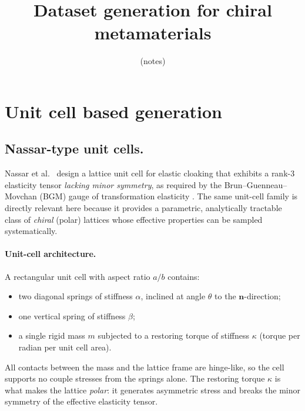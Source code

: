 \documentclass{article}
\title{Dataset generation for chiral metamaterials\vspace{-1em}}
\author{(notes)}
\date{}
\begin{document}
\maketitle
\tableofcontents

\section{Unit cell based generation}


\subsection{Nassar-type unit cells.}

Nassar et al.\ \cite{nassar2018} design a lattice unit cell for elastic
cloaking that exhibits a rank-3 elasticity tensor \emph{lacking minor
symmetry}, as required by the Brun--Guenneau--Movchan (BGM) gauge of
transformation elasticity \cite{brun2009}.  The same unit-cell family is
directly relevant here because it provides a parametric, analytically
tractable class of \emph{chiral} (polar) lattices whose effective properties
can be sampled systematically.

\paragraph{Unit-cell architecture.}
A rectangular unit cell with aspect ratio $a/b$ contains:
\begin{itemize}
    \item two diagonal springs of stiffness $\alpha$, inclined at angle
          $\theta$ to the $\mathbf{n}$-direction;
    \item one vertical spring of stiffness $\beta$;
    \item a single rigid mass $m$ subjected to a restoring torque of
          stiffness $\kappa$ (torque per radian per unit cell area).
\end{itemize}
All contacts between the mass and the lattice frame are hinge-like, so the
cell supports no couple stresses from the springs alone.  The restoring torque
$\kappa$ is what makes the lattice \emph{polar}: it generates asymmetric
stress and breaks the minor symmetry of the effective elasticity tensor.
\end{document}
